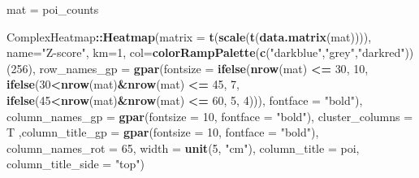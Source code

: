 \documentclass[]{article}
\newenvironment{Shaded}{\begin{snugshade}}{\end{snugshade}}
\newcommand{\DataTypeTok}[1]{\textcolor[rgb]{0.13,0.29,0.53}{#1}}
\newcommand{\DecValTok}[1]{\textcolor[rgb]{0.00,0.00,0.81}{#1}}
\newcommand{\KeywordTok}[1]{\textcolor[rgb]{0.13,0.29,0.53}{\textbf{#1}}}
\newcommand{\NormalTok}[1]{#1}
\newcommand{\OperatorTok}[1]{\textcolor[rgb]{0.81,0.36,0.00}{\textbf{#1}}}
\newcommand{\StringTok}[1]{\textcolor[rgb]{0.31,0.60,0.02}{#1}}
\begin{document}
\begin{Shaded}
\begin{Highlighting}[]
\NormalTok{mat =}\StringTok{ }\NormalTok{poi_counts}

\NormalTok{ComplexHeatmap}\OperatorTok{::}\KeywordTok{Heatmap}\NormalTok{(}\DataTypeTok{matrix =} \KeywordTok{t}\NormalTok{(}\KeywordTok{scale}\NormalTok{(}\KeywordTok{t}\NormalTok{(}\KeywordTok{data.matrix}\NormalTok{(mat)))), }\DataTypeTok{name=}\StringTok{"Z-score"}\NormalTok{, }\DataTypeTok{km=}\DecValTok{1}\NormalTok{, }
                        \DataTypeTok{col=}\KeywordTok{colorRampPalette}\NormalTok{(}\KeywordTok{c}\NormalTok{(}\StringTok{"darkblue"}\NormalTok{,}\StringTok{"grey"}\NormalTok{,}\StringTok{"darkred"}\NormalTok{))(}\DecValTok{256}\NormalTok{), }
                        \DataTypeTok{row_names_gp =} \KeywordTok{gpar}\NormalTok{(}\DataTypeTok{fontsize =} \KeywordTok{ifelse}\NormalTok{(}\KeywordTok{nrow}\NormalTok{(mat) }\OperatorTok{<=}\StringTok{ }\DecValTok{30}\NormalTok{, }\DecValTok{10}\NormalTok{, }
                                                       \KeywordTok{ifelse}\NormalTok{(}\DecValTok{30}\OperatorTok{<}\KeywordTok{nrow}\NormalTok{(mat)}\OperatorTok{&}\KeywordTok{nrow}\NormalTok{(mat) }\OperatorTok{<=}\StringTok{ }\DecValTok{45}\NormalTok{, }\DecValTok{7}\NormalTok{,}
                                                       \KeywordTok{ifelse}\NormalTok{(}\DecValTok{45}\OperatorTok{<}\KeywordTok{nrow}\NormalTok{(mat)}\OperatorTok{&}\KeywordTok{nrow}\NormalTok{(mat) }\OperatorTok{<=}\StringTok{ }\DecValTok{60}\NormalTok{, }\DecValTok{5}\NormalTok{, }\DecValTok{4}\NormalTok{))), }
                                            \DataTypeTok{fontface =} \StringTok{"bold"}\NormalTok{),}
                        \DataTypeTok{column_names_gp =} \KeywordTok{gpar}\NormalTok{(}\DataTypeTok{fontsize =} \DecValTok{10}\NormalTok{, }\DataTypeTok{fontface =} \StringTok{"bold"}\NormalTok{),}
                        \DataTypeTok{cluster_columns =}\NormalTok{ T ,}\DataTypeTok{column_title_gp =} \KeywordTok{gpar}\NormalTok{(}\DataTypeTok{fontsize =} \DecValTok{10}\NormalTok{, }\DataTypeTok{fontface =} \StringTok{"bold"}\NormalTok{), }
                        \DataTypeTok{column_names_rot =} \DecValTok{65}\NormalTok{, }\DataTypeTok{width =} \KeywordTok{unit}\NormalTok{(}\DecValTok{5}\NormalTok{, }\StringTok{"cm"}\NormalTok{),}
                        \DataTypeTok{column_title =}\NormalTok{ poi, }\DataTypeTok{column_title_side =} \StringTok{"top"}\NormalTok{) }
\end{Highlighting}
\end{Shaded}
\end{document}
